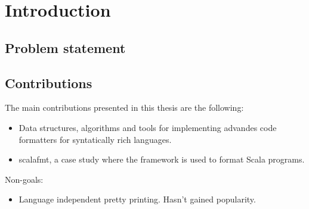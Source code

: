 
\section{Introduction} %
\label{sec:Introduction}

\subsection{Problem statement}
\subsection{Contributions}
The main contributions presented in this thesis are the following:
\begin{itemize}
    \item Data structures, algorithms and tools for implementing advandes code formatters for syntatically rich languages.
    \item scalafmt, a case study where the framework is used to format Scala programs.
\end{itemize}
Non-goals:
\begin{itemize}
    \item Language independent pretty printing. Hasn't gained popularity.
\end{itemize}
